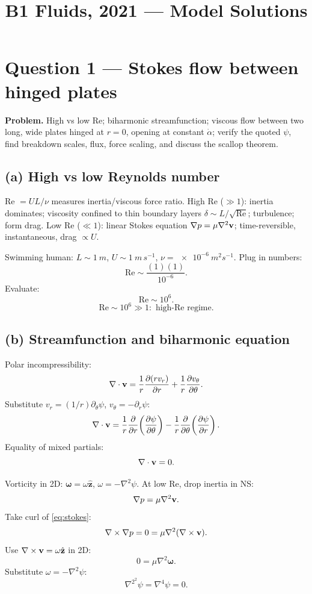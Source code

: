 \documentclass[11pt]{article}
\title{B1 Fluids, 2021 --- Model Solutions}
\author{}
\date{}
\newcommand{\pd}[2]{\frac{\partial #1}{\partial #2}}
\newcommand{\Lap}{\nabla^{2}}
\newcommand{\zhat}{\hat{\mathbf{z}}}
\begin{document}
\maketitle

\section*{Question 1 --- Stokes flow between hinged plates}

\textbf{Problem.} High vs low Re; biharmonic streamfunction; viscous flow between two long, wide plates hinged at $r=0$, opening at constant $\dot\alpha$; verify the quoted $\psi$, find breakdown scales, flux, force scaling, and discuss the scallop theorem.

\subsection*{(a) High vs low Reynolds number}

Re $=UL/\nu$ measures inertia/viscous force ratio.
High Re ($\gg 1$): inertia dominates; viscosity confined to thin boundary layers $\delta\sim L/\sqrt{\mathrm{Re}}$; turbulence; form drag.
Low Re ($\ll 1$): linear Stokes equation $\nabla p=\mu\Lap\vb v$; time-reversible, instantaneous, drag $\propto U$.

Swimming human: $L\sim\SI{1}{m}$, $U\sim\SI{1}{m\,s^{-1}}$, $\nu=\SI{e-6}{m^2 s^{-1}}$.
Plug in numbers:
\[ \mathrm{Re}\sim \frac{(1)(1)}{10^{-6}}. \]
Evaluate:
\[ \mathrm{Re}\sim 10^{6}. \]
\[ \boxed{\;\mathrm{Re}\sim 10^{6}\gg 1:\text{ high-Re regime.}\;} \]

\subsection*{(b) Streamfunction and biharmonic equation}

Polar incompressibility:
\[ \nabla\cdot\vb v = \frac{1}{r}\pd{(rv_r)}{r}+\frac{1}{r}\pd{v_\theta}{\theta}. \]
Substitute $v_r=(1/r)\partial_\theta\psi$, $v_\theta=-\partial_r\psi$:
\[ \nabla\cdot\vb v = \frac{1}{r}\pd{}{r}\!\left(\pd{\psi}{\theta}\right) - \frac{1}{r}\pd{}{\theta}\!\left(\pd{\psi}{r}\right). \]
Equality of mixed partials:
\[ \nabla\cdot\vb v = 0. \]

Vorticity in 2D: $\bm\omega=\omega\zhat$, $\omega=-\Lap\psi$.
At low Re, drop inertia in NS:
\begin{equation}
\nabla p = \mu\Lap\vb v.
\label{eq:stokes}
\end{equation}
Take curl of \eqref{eq:stokes}:
\[ \nabla\times\nabla p = 0 = \mu\Lap(\nabla\times\vb v). \]
Use $\nabla\times\vb v = \omega\zhat$ in 2D:
\[ 0 = \mu\Lap\bm\omega. \]
Substitute $\omega=-\Lap\psi$:
\begin{equation}
\boxed{\;\Lap^{2}\psi = \nabla^{4}\psi = 0.\;}
\label{eq:biharm}
\end{equation}
\end{document}
